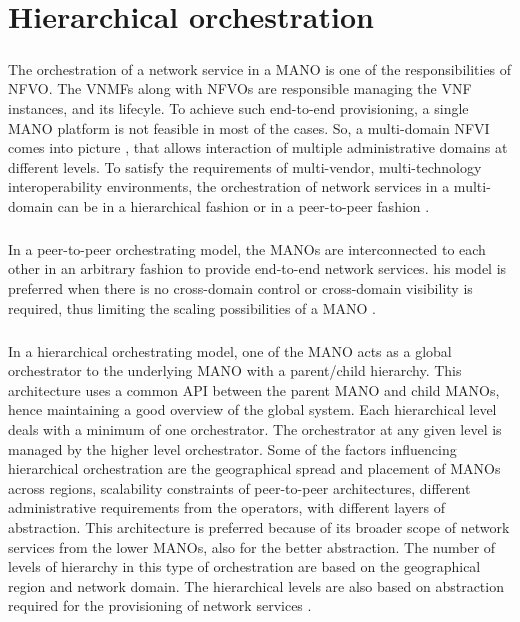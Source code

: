 \chapter{Hierarchical orchestration}
\label{ch:Hierarchical Orchestration}

\paragraph{} The orchestration of a network service in a MANO is one of the responsibilities of NFVO. The VNMFs along with NFVOs are responsible managing the VNF instances, and its lifecyle. To achieve such end-to-end provisioning, a single MANO platform is not feasible in most of the cases. So, a multi-domain NFVI comes into picture , that allows interaction of multiple administrative domains at different levels. To satisfy the requirements of multi-vendor, multi-technology interoperability environments, the orchestration of network services in a multi-domain can be in a hierarchical fashion or in a peer-to-peer fashion \cite{munoz2018hierarchical}.

\paragraph{} In a peer-to-peer orchestrating model, the MANOs are interconnected to each other in an arbitrary fashion to provide end-to-end network services. his model is preferred when
there is no cross-domain control or cross-domain visibility is required, thus limiting the scaling
possibilities of a MANO \cite{munoz2018hierarchical}.


\paragraph{}In a hierarchical orchestrating model, one of the MANO acts as a global orchestrator to the
underlying MANO with a parent/child hierarchy. This architecture uses a common API between
the parent MANO and child MANOs, hence maintaining a good overview of the global system. Each hierarchical level deals with a minimum of one orchestrator. The orchestrator at any given level is managed by the higher level orchestrator. Some of the factors influencing hierarchical orchestration are the geographical spread and placement of MANOs across regions, scalability constraints of peer-to-peer architectures, different administrative requirements from the operators, with different layers of abstraction. This architecture is preferred because of its broader scope of network services from the lower MANOs, also for the better abstraction. The number of levels of hierarchy in this type of orchestration are based on the geographical region and network domain. The hierarchical levels are also based on abstraction required for the provisioning of network services \cite{munoz2018hierarchical}.

